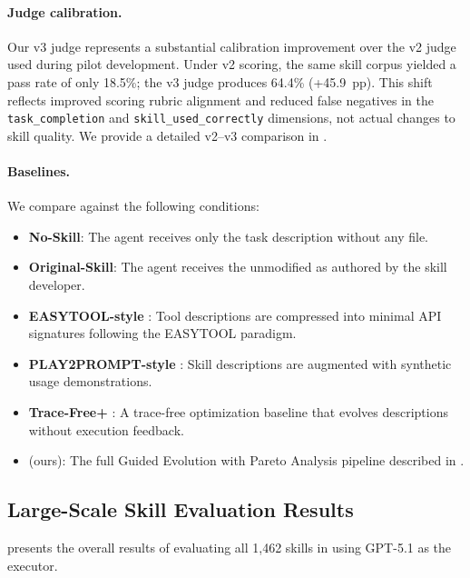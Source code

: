 \paragraph{Judge calibration.}
Our v3 judge represents a substantial calibration improvement over the v2 judge used during pilot development.
Under v2 scoring, the same skill corpus yielded a pass rate of only 18.5\%; the v3 judge produces 64.4\% (+45.9~pp).
This shift reflects improved scoring rubric alignment and reduced false negatives in the \texttt{task\_completion} and \texttt{skill\_used\_correctly} dimensions, not actual changes to skill quality.
We provide a detailed v2--v3 comparison in .

\paragraph{Baselines.}
We compare against the following conditions:
\begin{itemize}[nosep,leftmargin=*]
  \item \textbf{No-Skill}: The agent receives only the task description without any \skillmd file.
  \item \textbf{Original-Skill}: The agent receives the unmodified \skillmd as authored by the skill developer.
  \item \textbf{EASYTOOL-style} \citep{easytool2024}: Tool descriptions are compressed into minimal API signatures following the EASYTOOL paradigm.
  \item \textbf{PLAY2PROMPT-style} \citep{play2prompt2025}: Skill descriptions are augmented with synthetic usage demonstrations.
  \item \textbf{Trace-Free+} \citep{tracefree2026}: A trace-free optimization baseline that evolves descriptions without execution feedback.
  \item \textbf{\gepamed} (ours): The full Guided Evolution with Pareto Analysis pipeline described in .
\end{itemize}

\subsection{Large-Scale Skill Evaluation Results}
\label{ssec:main_results}

 presents the overall results of evaluating all 1,462 skills in \medskillbench using GPT-5.1 as the executor.


